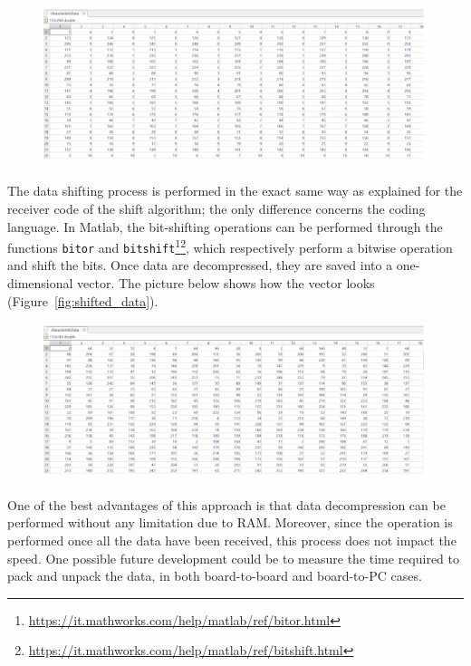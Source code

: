 \documentclass{Configuration_Files/PoliMi3i_thesis}
\begin{document}
\begin{figure}[H]
    \centering
    \includegraphics[scale=0.3]{Board Windows PC/6.png}
    \label{fig:nrf_connect_log}
\end{figure}

The data shifting process is performed in the exact same way as explained for the receiver code of the shift algorithm; the only difference concerns the coding language. In Matlab, the bit-shifting operations can be performed through the functions \texttt{bitor} and \texttt{bitshift}\footnote{\url{https://it.mathworks.com/help/matlab/ref/bitor.html}}\footnote{\url{https://it.mathworks.com/help/matlab/ref/bitshift.html}}, which respectively perform a bitwise operation and shift the bits. Once data are decompressed, they are saved into a one-dimensional vector. The picture below shows how the vector looks (Figure~\ref{fig:shifted_data}).

\begin{figure}[H]
    \centering
    \includegraphics[scale=0.3]{Board Windows PC/7.png}
    \label{fig:nrf_connect_log}
\end{figure}

One of the best advantages of this approach is that data decompression can be performed without any limitation due to RAM. Moreover, since the operation is performed once all the data have been received, this process does not impact the speed. One possible future development could be to measure the time required to pack and unpack the data, in both board-to-board and board-to-PC cases.
\end{document}
